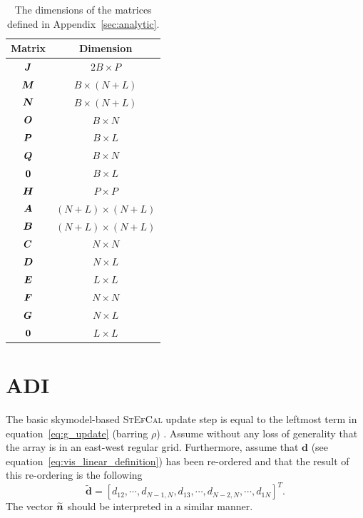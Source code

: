 \documentclass[useAMS,usenatbib]{mn2e}
\newcommand{\bA}{\bmath{A}}
\newcommand{\bB}{\bmath{B}}
\newcommand{\bC}{\bmath{C}}
\newcommand{\bE}{\bmath{E}}
\newcommand{\bF}{\bmath{F}}
\newcommand{\bG}{\bmath{G}}
\newcommand{\bn}{\bmath{n}}
\newcommand{\bJ}{\bmath{J}}
\newcommand{\bD}{\bmath{D}}
\newcommand{\bH}{\bmath{H}}
\newcommand{\bN}{\bmath{N}}
\newcommand{\bM}{\bmath{M}}
\newcommand{\bO}{\bmath{O}}
\newcommand{\bP}{\bmath{P}}
\newcommand{\bQ}{\bmath{Q}}
\newcommand{\bzero}{\bmath{0}}
\begin{document}
\begin{table}
\centering
\caption{The dimensions of the matrices defined in Appendix~\ref{sec:analytic}.}
\begin{tabular}{|c c|} 
\hline
Matrix & Dimension\\
\hline
\hline
$\bJ$ & $2B \times P$ \\
$\bM$ & $B \times (N+L)$ \\
$\bN$ & $B \times (N+L)$ \\
$\bO$ & $B \times N$ \\
$\bP$ & $B \times L$ \\
$\bQ$ & $B \times N$ \\
$\bzero$ & $B \times L$ \\
\hline
\hline
$\bH$ & $P\times P$\\
$\bA$ & $(N+L)\times (N+L)$\\
$\bB$ & $(N+L)\times (N+L)$\\
$\bC$ & $N \times N$\\
$\bD$ & $N \times L$\\
$\bE$ & $L \times L$\\
$\bF$ & $N \times N$\\
$\bG$ & $N \times L$\\
$\bzero$ & $L \times L$\\
\hline
\end{tabular}
\label{tab:matrix_dimensions}
\end{table}

\section{ADI}
\label{sec:red_stef_ADI}
The basic skymodel-based \textsc{StEfCal} update step is equal to  the leftmost term in equation~\ref{eq:g_update} (barring $\rho$) \citep{Salvini2014}.
Assume without any loss of generality that the array is in an east-west regular grid. Furthermore, assume that $\boldsymbol{d}$ (see equation~\ref{eq:vis_linear_definition}) has been re-ordered 
and that the result of this re-ordering is the following
\begin{equation}
\widetilde{\boldsymbol{d}} = \left[d_{12},\cdots,d_{N-1,N},d_{13},\cdots,d_{N-2,N},\cdots,d_{1N}\right]^T .
\end{equation}
The vector $\widetilde{\bn}$ should be interpreted in a similar manner.
\end{document}
